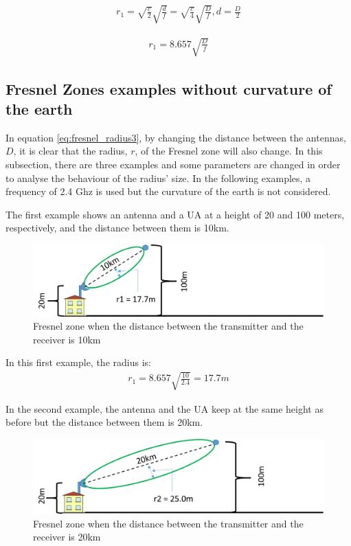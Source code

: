 \begin{align}
r_1 = \sqrt{\frac{c}{2}}\sqrt{\frac{d}{f}} = \sqrt{\frac{c}{4}}\sqrt{\frac{D}{f}}, d=\frac{D}{2} \label{eq:fresnel_radius2}
\end{align}

\begin{align}
r_1 = 8.657 \sqrt{\frac{D}{f}} \label{eq:fresnel_radius3}
\end{align}

\subsection{Fresnel Zones examples without curvature of the earth}
In equation \ref{eq:fresnel_radius3}, by changing the distance between the antennas, $D$, it is clear that the radius, $r$, of the Fresnel zone will also change. In this subsection, there are three examples and some parameters are changed in order to analyse the behaviour of the radius' size. In the following examples, a frequency of 2.4 Ghz is used but the curvature of the earth is not considered. 

The first example shows an antenna and a UA at a height of 20 and 100 meters, respectively, and the distance between them is 10km.

\begin{figure}[H]
	\centering
	\includegraphics[scale=0.50]{figures/fresnel_10km.png}
	\caption{Fresnel zone when the distance between the transmitter and the receiver is 10km}
	\label{fig:fresnel_zones_10km}
\end{figure}  

In this first example, the radius is:
\begin{align*}
r_1 = 8.657 \sqrt{\frac{10}{2.4}} = 17.7m
\end{align*}

In the second example, the antenna and the UA keep at the same height as before but the distance between them is 20km.

\begin{figure}[H]
	\centering
	\includegraphics[scale=0.50]{figures/fresnel_20km.png}
	\caption{Fresnel zone when the distance between the transmitter and the receiver is 20km}
	\label{fig:fresnel_zones_20km}
\end{figure}  

